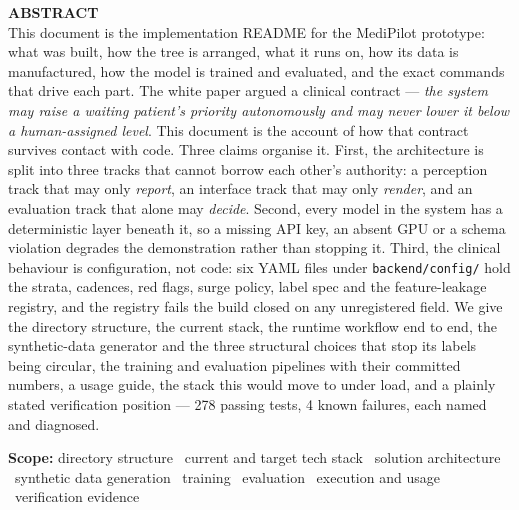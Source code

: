 \documentclass[10pt,a4paper,twocolumn]{article}
\newcommand{\pth}[1]{\textcolor{SecPurple}{\texttt{#1}}}
\begin{document}
{\vspace{7pt}
\begin{tcolorbox}[mpbox,colback=White,leftrule=0pt,left=0pt,right=0pt,top=2pt,bottom=2pt]
{\sffamily\scriptsize\bfseries\color{AccPurple}ABSTRACT}\\[2pt]
\footnotesize
This document is the implementation README for the MediPilot prototype: what was built, how the
tree is arranged, what it runs on, how its data is manufactured, how the model is trained and
evaluated, and the exact commands that drive each part. The white paper argued a clinical contract
--- \emph{the system may raise a waiting patient's priority autonomously and may never lower it
below a human-assigned level}. This document is the account of how that contract survives contact
with code. Three claims organise it. First, the architecture is split into three tracks that
cannot borrow each other's authority: a perception track that may only \emph{report}, an interface
track that may only \emph{render}, and an evaluation track that alone may \emph{decide}. Second,
every model in the system has a deterministic layer beneath it, so a missing API key, an absent GPU
or a schema violation degrades the demonstration rather than stopping it. Third, the clinical
behaviour is configuration, not code: six YAML files under \pth{backend/config/} hold the strata,
cadences, red flags, surge policy, label spec and the feature-leakage registry, and the registry
fails the build closed on any unregistered field. We give the directory structure, the current
stack, the runtime workflow end to end, the synthetic-data generator and the three structural
choices that stop its labels being circular, the training and evaluation pipelines with their
committed numbers, a usage guide, the stack this would move to under load, and a plainly stated
verification position --- 278 passing tests, 4 known failures, each named and diagnosed.

\vspace{3pt}
{\sffamily\scriptsize\color{MedGray}\textbf{\color{NearBlack}Scope:}\; directory structure \textbullet\ current and target tech stack \textbullet\ solution architecture \textbullet\ synthetic data generation \textbullet\ training \textbullet\ evaluation \textbullet\ execution and usage \textbullet\ verification evidence}
\end{tcolorbox}

}
\end{document}
